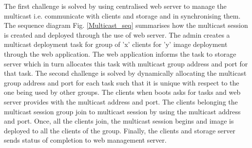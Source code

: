 \documentclass[a4paper,12pt]{article}
\begin{document}
The first challenge is solved by using centralised web server to manage the multicast i.e. communicate with clients and storage and in synchronising them. The sequence diagram Fig. \ref{Multicast_seq} summarises how the multicast session is created and deployed through the use of web server. The admin creates a multicast deployment task for group of 'x' clients for 'y' image deployment through the web application. The web application informs the task to storage server which in turn allocates this task with multicast group address and port for that task. The second challenge is solved by dynamically allocating the multicast group address and port for each task such that it is unique with respect to the one being used by other groups. The clients when boots asks for tasks and web server provides with the multicast address and port. The clients belonging the multicast session group join to multicast session by using the multicast address and port. Once, all the clients join, the multicast session begins and image is deployed to all the clients of the group. Finally, the clients and storage server sends status of completion to web management server.

\end{document}
